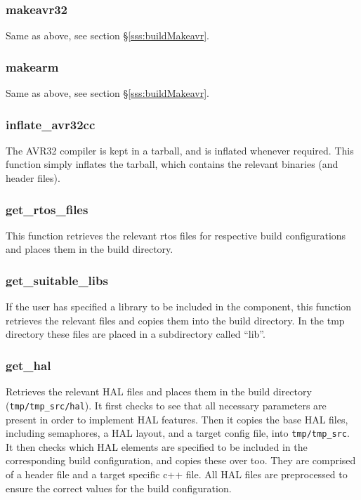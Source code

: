 \documentclass[a4paper, oneside, 11pt, titlepage, onecolumn, openright]{report}
\begin{document}
\subsubsection{makeavr32}
			\label{sss:buildMakeavr32}
			Same as above, see section \S\ref{sss:buildMakeavr}.
			
\subsubsection{makearm}
			\label{sss:buildMakearm}
			Same as above, see section \S\ref{sss:buildMakeavr}.
			
\subsubsection{inflate\_avr32cc}
			\label{sss:buildInflateavr32cc}
			The AVR32 compiler is kept in a tarball, and is inflated whenever required. This function simply inflates the tarball, which contains the relevant binaries (and header files).
			
\subsubsection{get\_rtos\_files}
			\label{sss:buildGetrtosfiles}
			This function retrieves the relevant rtos files for respective build configurations and places them in the build directory.
			
\subsubsection{get\_suitable\_libs}
			\label{sss:buildGetsuitablelibs}
			If the user has specified a library to be included in the component, this function retrieves the relevant files and copies them into the build directory. In the tmp directory these files are placed in a subdirectory called ``lib''.
			
\subsubsection{get\_hal}
			\label{sss:buildGethal}
			Retrieves the relevant HAL files and places them in the build directory (\texttt{tmp/tmp\_src/hal}). It first checks to see that all necessary parameters are present in order to implement HAL features. Then it copies the base HAL files, including semaphores, a HAL layout, and a target config file, into \texttt{tmp/tmp\_src}. \newline
			It then checks which HAL elements are specified to be included in the corresponding build configuration, and copies these over too. They are comprised of a header file and a target specific c++ file. All HAL files are preprocessed to ensure the correct values for the build configuration.
			
\end{document}
